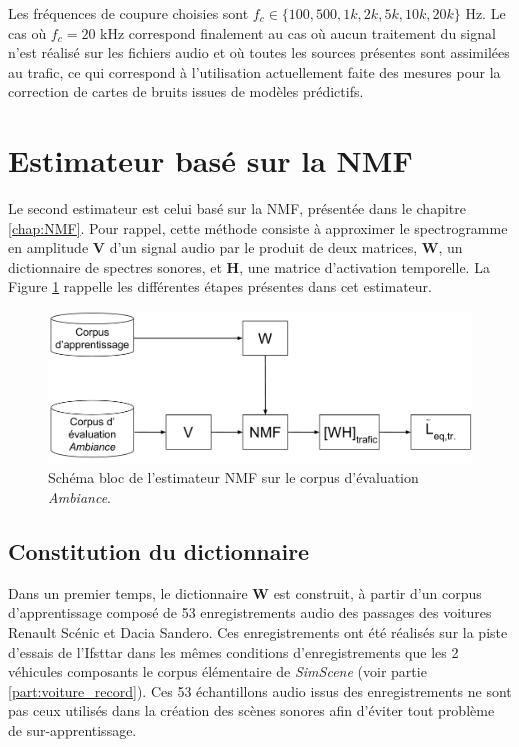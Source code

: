 Les fréquences de coupure choisies sont $f_c \in \lbrace 100, 500, 1k, 2k, 5k, 10k, 20k \rbrace$ Hz. Le cas où $f_c = 20$ kHz correspond finalement au cas où aucun traitement du signal n'est réalisé sur les fichiers audio et où toutes les sources présentes sont assimilées au trafic, ce qui correspond à l'utilisation actuellement faite des mesures pour la correction de cartes de bruits issues de modèles prédictifs.


\section{Estimateur basé sur la NMF}
Le second estimateur est celui basé sur la NMF, présentée dans le chapitre \ref{chap:NMF}. Pour rappel, cette méthode consiste à approximer le spectrogramme en amplitude $\mathbf{V}$ d'un signal audio par le produit de deux matrices, $\mathbf{W}$, un dictionnaire de spectres sonores, et $\mathbf{H}$, une matrice d'activation temporelle. La Figure \ref{fig:nmf_ambiance} rappelle les différentes étapes présentes dans cet estimateur.

\begin{figure}[ht]
\centering
\includegraphics[width=0.7\linewidth]{./figures/NMF/NMF_ambiance.pdf}
\caption{Schéma bloc de l'estimateur NMF sur le corpus d'évaluation \textit{Ambiance}.}
\label{fig:nmf_ambiance}
\end{figure}


\subsection{Constitution du dictionnaire} 

Dans un premier temps, le dictionnaire $\mathbf{W}$ est construit, à partir d'un corpus d'apprentissage composé de 53  enregistrements audio des passages des voitures Renault Scénic et Dacia Sandero. Ces enregistrements ont été réalisés sur la piste d'essais de l'Ifsttar dans les mêmes conditions d'enregistrements que les 2 véhicules composants le corpus élémentaire de \textit{SimScene} (voir partie \ref{part:voiture_record}). Ces 53 échantillons audio issus des enregistrements ne sont pas ceux utilisés dans la création des scènes sonores afin d'éviter tout problème de sur-apprentissage.

